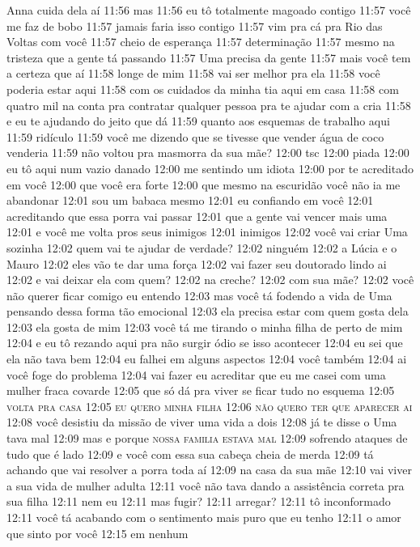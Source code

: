 {\parindent0pt\parskip1pt\raggedright
Anna cuida dela aí 11:56 mas 11:56 eu tô totalmente magoado contigo
11:57 você me faz de bobo 11:57 jamais faria isso contigo 11:57 vim pra
cá pra Rio das Voltas com você 11:57 cheio de esperança 11:57
determinação 11:57 mesmo na tristeza que a gente tá passando 11:57 Uma
precisa da gente 11:57 mais você tem a certeza que aí 11:58 longe de mim
11:58 vai ser melhor pra ela 11:58 você poderia estar aqui 11:58 com os
cuidados da minha tia aqui em casa 11:58 com quatro mil na conta pra
contratar qualquer pessoa pra te ajudar com a cria 11:58 e eu te
ajudando do jeito que dá 11:59 quanto aos esquemas de trabalho aqui
11:59 ridículo 11:59 você me dizendo que se tivesse que vender água de
coco venderia 11:59 não voltou pra masmorra da sua mãe? 12:00 tsc 12:00
piada 12:00 eu tô aqui num vazio danado 12:00 me sentindo um idiota
12:00 por te acreditado em você 12:00 que você era forte 12:00 que mesmo
na escuridão você não ia me abandonar 12:01 sou um babaca mesmo 12:01 eu
confiando em você 12:01 acreditando que essa porra vai passar 12:01 que
a gente vai vencer mais uma 12:01 e você me volta pros seus inimigos
12:01 inimigos 12:02 você vai criar Uma sozinha 12:02 quem vai te ajudar
de verdade? 12:02 ninguém 12:02 a Lúcia e o Mauro 12:02 eles vão te dar
uma força 12:02 vai fazer seu doutorado lindo ai 12:02 e vai deixar ela
com quem? 12:02 na creche? 12:02 com sua mãe? 12:02 você não querer
ficar comigo eu entendo 12:03 mas você tá fodendo a vida de Uma pensando
dessa forma tão emocional 12:03 ela precisa estar com quem gosta dela
12:03 ela gosta de mim 12:03 você tá me tirando o minha filha de perto
de mim 12:04 e eu tô rezando aqui pra não surgir ódio se isso acontecer
12:04 eu sei que ela não tava bem 12:04 eu falhei em alguns aspectos
12:04 você também 12:04 ai você foge do problema 12:04 vai fazer eu
acreditar que eu me casei com uma mulher fraca covarde 12:05 que só dá
pra viver se ficar tudo no esquema 12:05 \textsc{volta pra casa 12:05 eu quero
minha filha 12:06 não quero ter que aparecer ai} 12:08 você desistiu da
missão de viver uma vida a dois 12:08 já te disse o Uma tava mal 12:09
mas e porque \textsc{nossa familia estava mal} 12:09 sofrendo ataques de tudo que
é lado 12:09 e você com essa sua cabeça cheia de merda 12:09 tá achando
que vai resolver a porra toda aí 12:09 na casa da sua mãe 12:10 vai
viver a sua vida de mulher adulta 12:11 você não tava dando a
assistência correta pra sua filha 12:11 nem eu 12:11 mas fugir? 12:11
arregar? 12:11 tô inconformado 12:11 você tá acabando com o sentimento
mais puro que eu tenho 12:11 o amor que sinto por você 12:15 em nenhum
}
